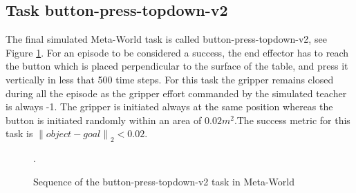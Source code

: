 \subsection{Task button-press-topdown-v2}
\label{subsection:metaworld-button-press-topdown-v2}

The final simulated Meta-World task is called button-press-topdown-v2, see Figure \ref{fig:sequence-button}. For an episode to be considered a success, the end effector has to reach the button which is placed perpendicular to the surface of the table, and press it vertically in less that 500 time steps.
For this task the gripper remains closed during all the episode as the gripper effort commanded by the simulated teacher is always -1. The gripper is initiated always at the same position whereas the button is initiated randomly within an area of  $0.02m^2$.The success metric for this task is ${\left\lVert object-goal \right\rVert}_2 < 0.02$.

 \begin{figure}[H]
  \centering
  \hspace*{\fill}%
   \hfill
   \hfill
  \hspace*{\fill}%
  \caption{Sequence of the button-press-topdown-v2 task in Meta-World}.
  \label{fig:sequence-button}
\end{figure}


